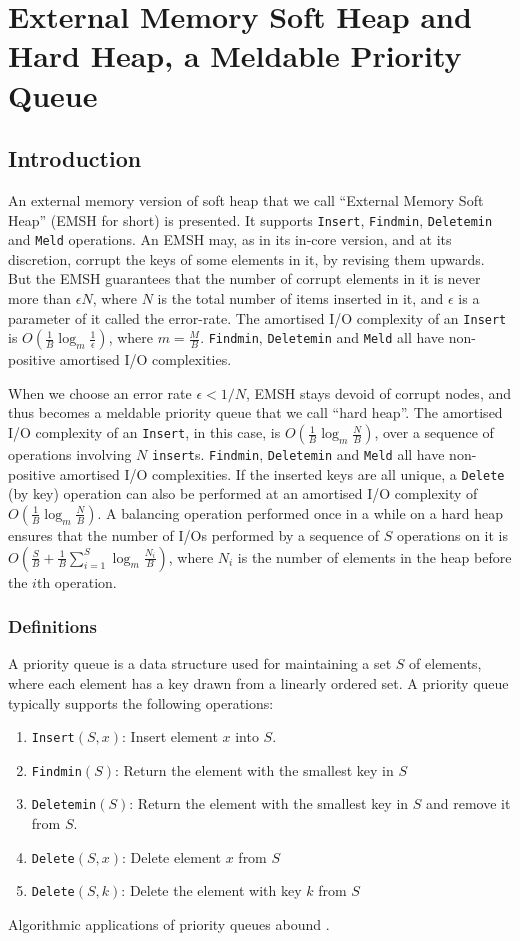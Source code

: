 \chapter{External Memory Soft Heap and Hard Heap, a Meldable Priority Queue}
\label{emsh:chapt}
\section{Introduction}
An external memory version of soft heap that we call ``External Memory Soft Heap''
(EMSH for short) is presented. 
It supports {\tt Insert}, {\tt Findmin}, {\tt Deletemin} and {\tt Meld} operations.
An EMSH may, as in its in-core version, and at its discretion, 
corrupt the keys of some elements in it, by revising them upwards.
But the EMSH guarantees that the number of corrupt elements in it is never more than
$\epsilon N$, where $N$ is the total number of items inserted in it, and $\epsilon$ is
a parameter of it called the error-rate.
The amortised I/O complexity of an {\tt Insert} is 
$O(\frac{1}{B} \log_{m}\frac{1}{\epsilon})$, where $m = \frac{M}{B}$.
{\tt Findmin}, {\tt Deletemin} and {\tt Meld} all have non-positive amortised I/O complexities.

When we choose an error rate $\epsilon<1/N$, EMSH stays devoid of corrupt nodes, 
and thus becomes a meldable priority queue that we call ``hard heap''.  
The amortised I/O complexity of an {\tt Insert}, in this case, is $O(\frac{1}{B} \log_{m}\frac{N}{B})$,
over a sequence of operations involving $N$ {\tt insert}s.
{\tt Findmin}, {\tt Deletemin} and {\tt Meld} all have non-positive amortised I/O complexities.
If the inserted keys are all unique, a {\tt Delete} (by key) operation can
	also be performed at an amortised I/O complexity of $O(\frac{1}{B} \log_{m}\frac{N}{B})$.
A balancing operation performed once in a while on a hard heap 
ensures that the number of I/Os performed by a sequence of $S$ operations on it is
$O(\frac{S}{B}+\frac{1}{B}\sum_{i = 1}^{S} \log_{m}\frac{N_i}{B})$, where
$N_i$ is the number of elements in the heap before the $i$th operation.

\subsection{Definitions}
A priority queue is a data structure used for maintaining a set $S$ of elements, 
	where each element has a key drawn from a linearly ordered set.
A priority queue typically supports the following operations:
\begin{enumerate}
\item {\tt Insert}$(S,x)$: Insert element $x$ into $S$.
\item {\tt Findmin}$(S)$: Return the element with the smallest key in $S$
\item {\tt Deletemin}$(S)$: Return the element with the smallest key in $S$ and remove it from $S$.
\item {\tt Delete}$(S,x)$: Delete element $x$ from $S$
\item {\tt Delete}$(S,k)$: Delete the element with key $k$ from $S$
\end{enumerate}
Algorithmic applications of priority queues abound \cite{AHU74,CLR90}.


